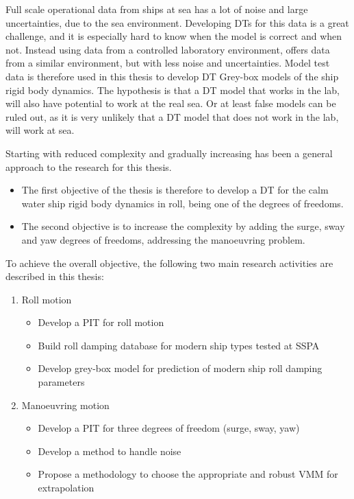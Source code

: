 Full scale operational data from ships at sea has a lot of noise and large uncertainties, due to the sea environment. Developing DTs for this data is a great challenge, and it is especially hard to know when the model is correct and when not. Instead using data from a controlled laboratory environment, offers data from a similar environment, but with less noise and uncertainties. 
Model test data is therefore used in this thesis to develop DT Grey-box models of the ship rigid body dynamics. The hypothesis is that a DT model that works in the lab, will also have potential to work at the real sea. Or at least false models can be ruled out, as it is very unlikely that a DT model that does not work in the lab, will work at sea. 

Starting with reduced complexity and gradually increasing has been a general approach to the research for this thesis.   

\begin{itemize}
\item The first objective of the thesis is therefore to develop a DT for the calm water ship rigid body dynamics in roll, being one of the degrees of freedoms.
\item The second objective is to increase the complexity by adding the surge, sway and yaw degrees of freedoms, addressing the manoeuvring problem.
\end{itemize}

\bigbreak
\noindent To achieve the overall objective, the following two main research activities are described in this thesis:
\begin{enumerate}

    \item Roll motion
    \begin{itemize}
        \item Develop a PIT for roll motion
        \item Build roll damping database for modern ship types tested at SSPA
        \item Develop grey-box model for prediction of modern ship roll damping parameters
    \end{itemize}
    
    \item Manoeuvring motion
    \begin{itemize}
        \item Develop a PIT for three degrees of freedom (surge, sway, yaw)
        \item Develop a method to handle noise
        \item Propose a methodology to choose the appropriate and robust VMM for extrapolation
 
    \end{itemize}
\end{enumerate}

